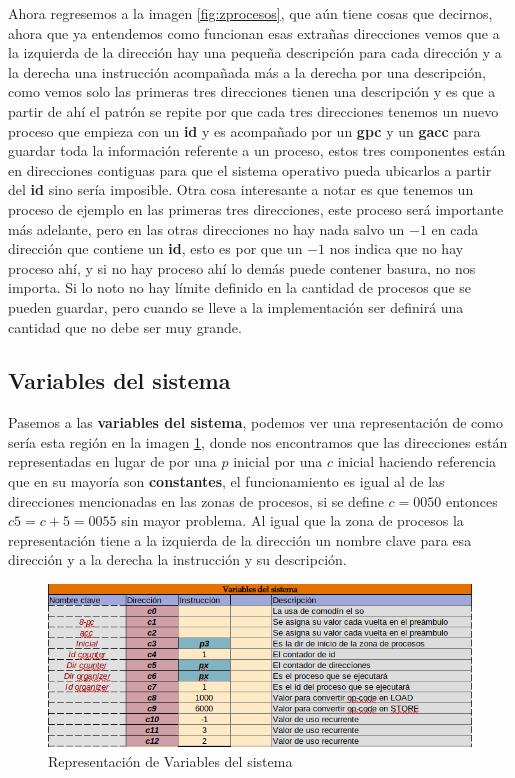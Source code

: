 \documentclass[12pt]{article}
\begin{document}
	
	Ahora regresemos a la imagen \ref{fig:zprocesos},
	que aún tiene cosas que decirnos, ahora que ya entendemos como funcionan esas extrañas direcciones vemos que a la izquierda
	de la dirección hay una pequeña descripción para cada dirección y a la derecha una instrucción acompañada más a la derecha
	por una descripción, como vemos solo las primeras tres direcciones tienen una descripción y es que a partir de ahí el patrón
	se repite por que cada tres direcciones tenemos un nuevo proceso que empieza con un \textbf{id} y es acompañado por un 
	\textbf{gpc} y un \textbf{gacc} para guardar toda la información referente a un proceso, estos tres componentes están en
	direcciones contiguas para que el sistema operativo pueda ubicarlos a partir del \textbf{id} sino sería imposible. Otra cosa
	interesante a notar es que tenemos un proceso de ejemplo en las primeras tres direcciones, este proceso será importante más adelante,
	pero en las otras direcciones no hay nada salvo un $-1$ en cada dirección que contiene un \textbf{id}, esto es por que
	un $-1$ nos indica que no hay proceso ahí, y si no hay proceso ahí lo demás puede contener basura, no nos importa. Si lo noto
	no hay límite definido en la cantidad de procesos que se pueden guardar, pero cuando se lleve a la implementación
	ser definirá una cantidad que no debe ser muy grande.
	
	\subsection{Variables del sistema}

	Pasemos a las \textbf{variables del sistema}, podemos ver una representación de como sería esta región en la imagen 
	\ref{fig:varSis}, donde nos encontramos que las direcciones están representadas en lugar de por una $p$ inicial por una
	$c$ inicial haciendo referencia que en su mayoría son \textbf{constantes}, el funcionamiento es igual al de las
	direcciones mencionadas en las zonas de procesos, si se define $c=0050$ entonces $c5=c+5=0055$ sin mayor problema. Al igual
	que la zona de procesos la representación tiene a la izquierda de la dirección un nombre clave para esa dirección y a la derecha
	la instrucción y su descripción.
	
	
	\begin{figure}[h]
		\centering
		\includegraphics[scale=0.5]{media/Variables_Sistema} 
		\caption{Representación de Variables del sistema}
		\label{fig:varSis}
	\end{figure}
	
\end{document}
